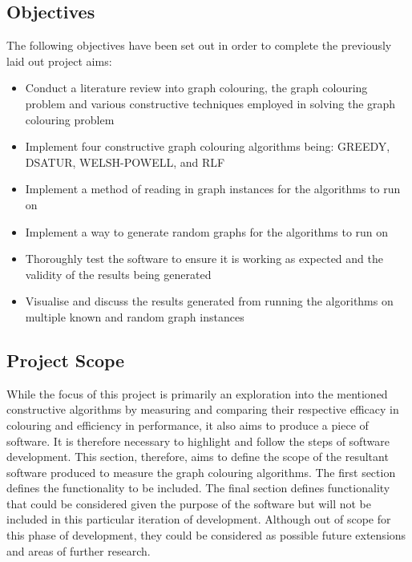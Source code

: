\subsection{Objectives}
The following objectives have been set out in order to complete the previously laid out project aims:
\begin{itemize}
    \item Conduct a literature review into graph colouring, the graph colouring problem and various constructive techniques employed in solving the graph colouring problem
    \item Implement four constructive graph colouring algorithms being: GREEDY, DSATUR, WELSH-POWELL, and RLF
    \item Implement a method of reading in graph instances for the algorithms to run on
    \item Implement a way to generate random graphs for the algorithms to run on
    \item Thoroughly test the software to ensure it is working as expected and the validity of the results being generated
    \item Visualise and discuss the results generated from running the algorithms on multiple known and random graph instances
\end{itemize}
	
\subsection{Project Scope}
While the focus of this project is primarily an exploration into the mentioned constructive algorithms by measuring and comparing their respective efficacy in colouring and efficiency in performance, it also aims to produce a piece of software. It is therefore necessary to highlight and follow the steps of software development. This section, therefore, aims to define the scope of the resultant software produced to measure the graph colouring algorithms. The first section defines the functionality to be included. The final section defines functionality that could be considered given the purpose of the software but will not be included in this particular iteration of development. Although out of scope for this phase of development, they could be considered as possible future extensions and areas of further research.
